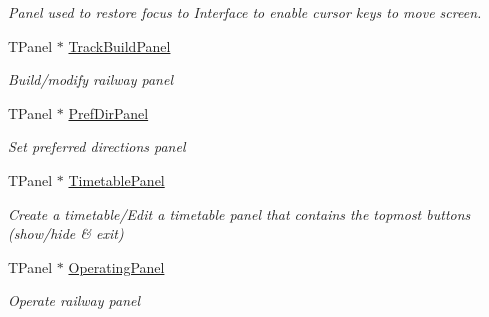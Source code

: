 \begin{DoxyCompactItemize}
\begin{DoxyCompactList}\small\item\em Panel used to restore focus to Interface to enable cursor keys to move screen. \end{DoxyCompactList}\item 
\mbox{\label{class_t_interface_a203c81dcf5ac3ae820cf17f6dfd21fff}} 
T\+Panel $\ast$ \mbox{\hyperlink{class_t_interface_a203c81dcf5ac3ae820cf17f6dfd21fff}{Track\+Build\+Panel}}
\begin{DoxyCompactList}\small\item\em \textquotesingle{}Build/modify railway\textquotesingle{} panel \end{DoxyCompactList}\item 
\mbox{\label{class_t_interface_a5fb96e72a347625f8fa80bc88144842d}} 
T\+Panel $\ast$ \mbox{\hyperlink{class_t_interface_a5fb96e72a347625f8fa80bc88144842d}{Pref\+Dir\+Panel}}
\begin{DoxyCompactList}\small\item\em \textquotesingle{}Set preferred directions\textquotesingle{} panel \end{DoxyCompactList}\item 
\mbox{\label{class_t_interface_aa0dce121f2c0feba11e8bda29cb16a97}} 
T\+Panel $\ast$ \mbox{\hyperlink{class_t_interface_aa0dce121f2c0feba11e8bda29cb16a97}{Timetable\+Panel}}
\begin{DoxyCompactList}\small\item\em \textquotesingle{}Create a timetable\textquotesingle{}/\textquotesingle{}Edit a timetable\textquotesingle{} panel that contains the topmost buttons (show/hide \& exit) \end{DoxyCompactList}\item 
\mbox{\label{class_t_interface_a9037b5b7dd4a95e2cc9b4c64ee97b015}} 
T\+Panel $\ast$ \mbox{\hyperlink{class_t_interface_a9037b5b7dd4a95e2cc9b4c64ee97b015}{Operating\+Panel}}
\begin{DoxyCompactList}\small\item\em \textquotesingle{}Operate railway\textquotesingle{} panel \end{DoxyCompactList}\item 
\mbox{\label{class_t_interface_a99b9c15c11d2620c255966f62b2b9226}} 

\end{DoxyCompactItemize}
